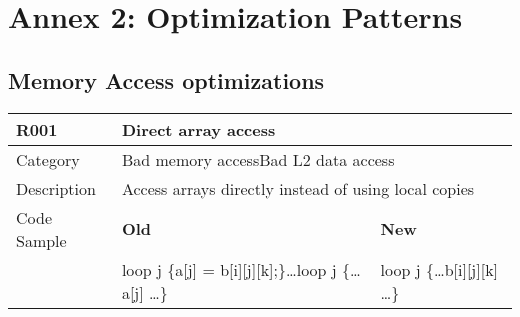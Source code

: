 \chapter{Annex 2: Optimization Patterns}
\label{ch:ch07_optimization_patterns}

\section{Memory Access optimizations}
\label{sec:Memory_Access_Optimizations}

\begin{tabular}{|p{0.9in}|p{2.0in}|p{2.0in}|} \hline
\textbf{R001}       & \multicolumn{2}{|p{4.0in}|}{\textbf{Direct array access}} \\ \hline
Category            & \multicolumn{2}{|p{4.0in}|}{Bad memory access\newline Bad L2 data access} \\ \hline
Description         & \multicolumn{2}{|p{4.0in}|}{Access arrays directly instead of using local copies} \\ \hline
Code Sample         & \textbf{Old}      & \textbf{New} \\ \hline
                    & loop j \{\newline   a[j] = b[i][j][k];\newline \}\newline \ldots\newline loop j \{\newline   \ldots a[j] \ldots\newline \}\newline
                    & loop j \{\newline   \ldots b[i][j][k] \ldots\newline \} \\ \hline
\end{tabular}


